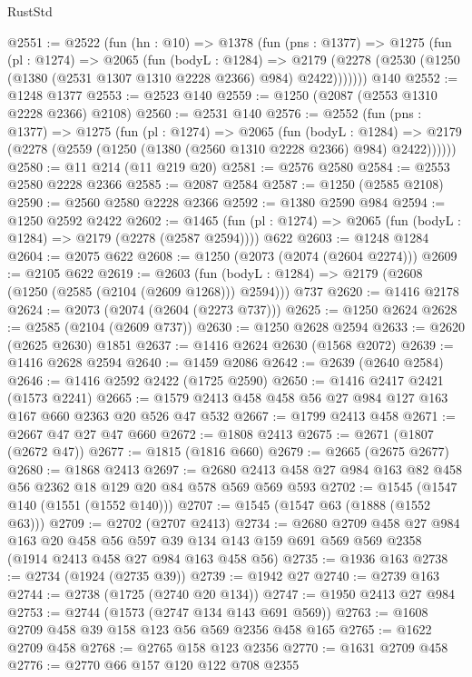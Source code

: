 \begin{lexlean}{RustStd}
\begin{coremodule}
{\begin{coremodule}
{{{{{{{{{{{{{@2551 := @2522
    (fun (hn : @10) =>
    @1378
      (fun (pns : @1377) =>
      @1275
        (fun (pl : @1274) =>
        @2065
          (fun (bodyL : @1284) =>
          @2179 (@2278 (@2530 (@1250 (@1380 (@2531 @1307 @1310 @2228 @2366) @984) @2422)))))))
    @140
@2552 := @1248 @1377
@2553 := @2523 @140
@2559 := @1250 (@2087 (@2553 @1310 @2228 @2366) @2108)
@2560 := @2531 @140
@2576 := @2552
    (fun (pns : @1377) =>
    @1275
      (fun (pl : @1274) =>
      @2065
        (fun (bodyL : @1284) =>
        @2179 (@2278 (@2559 (@1250 (@1380 (@2560 @1310 @2228 @2366) @984) @2422))))))
@2580 := @11 @214 (@11 @219 @20)
@2581 := @2576 @2580
@2584 := @2553 @2580 @2228 @2366
@2585 := @2087 @2584
@2587 := @1250 (@2585 @2108)
@2590 := @2560 @2580 @2228 @2366
@2592 := @1380 @2590 @984
@2594 := @1250 @2592 @2422
@2602 := @1465 (fun (pl : @1274) => @2065 (fun (bodyL : @1284) => @2179 (@2278 (@2587 @2594)))) @622
@2603 := @1248 @1284
@2604 := @2075 @622
@2608 := @1250 (@2073 (@2074 (@2604 @2274)))
@2609 := @2105 @622
@2619 := @2603
    (fun (bodyL : @1284) => @2179 (@2608 (@1250 (@2585 (@2104 (@2609 @1268))) @2594)))
    @737
@2620 := @1416 @2178
@2624 := @2073 (@2074 (@2604 (@2273 @737)))
@2625 := @1250 @2624
@2628 := @2585 (@2104 (@2609 @737))
@2630 := @1250 @2628 @2594
@2633 := @2620 (@2625 @2630) @1851
@2637 := @1416 @2624 @2630 (@1568 @2072)
@2639 := @1416 @2628 @2594
@2640 := @1459 @2086
@2642 := @2639 (@2640 @2584)
@2646 := @1416 @2592 @2422 (@1725 @2590)
@2650 := @1416 @2417 @2421 (@1573 @2241)
@2665 := @1579 @2413 @458 @458 @56 @27 @984 @127 @163 @167 @660 @2363 @20 @526 @47 @532
@2667 := @1799 @2413 @458
@2671 := @2667 @47 @27 @47 @660
@2672 := @1808 @2413
@2675 := @2671 (@1807 (@2672 @47))
@2677 := @1815 (@1816 @660)
@2679 := @2665 (@2675 @2677)
@2680 := @1868 @2413
@2697 := @2680 @2413 @458 @27 @984 @163 @82 @458 @56 @2362 @18 @129 @20 @84 @578 @569 @569 @593
@2702 := @1545 (@1547 @140 (@1551 (@1552 @140)))
@2707 := @1545 (@1547 @63 (@1888 (@1552 @63)))
@2709 := @2702 (@2707 @2413)
@2734 := @2680
    @2709
    @458
    @27
    @984
    @163
    @20
    @458
    @56
    @597
    @39
    @134
    @143
    @159
    @691
    @569
    @569
    @2358
    (@1914 @2413 @458 @27 @984 @163 @458 @56)
@2735 := @1936 @163
@2738 := @2734 (@1924 (@2735 @39))
@2739 := @1942 @27
@2740 := @2739 @163
@2744 := @2738 (@1725 (@2740 @20 @134))
@2747 := @1950 @2413 @27 @984
@2753 := @2744 (@1573 (@2747 @134 @143 @691 @569))
@2763 := @1608 @2709 @458 @39 @158 @123 @56 @569 @2356 @458 @165
@2765 := @1622 @2709 @458
@2768 := @2765 @158 @123 @2356
@2770 := @1631 @2709 @458
@2776 := @2770 @66 @157 @120 @122 @708 @2355
}}}}}}}}}}}}}
\end{coremodule}}
\end{coremodule}
\end{lexlean}
